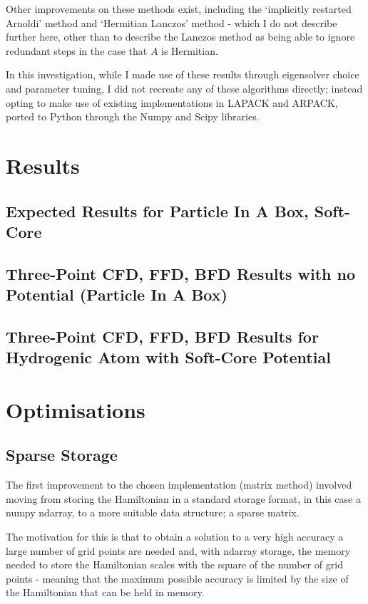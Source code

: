 Other improvements on these methods exist, including the `implicitly restarted Arnoldi' method and `Hermitian Lanczos' method - which I do not describe further here, other than to describe the Lanczos method as being able to ignore redundant steps in the case that $A$ is Hermitian.

In this investigation, while I made use of these results through eigensolver choice and parameter tuning, I did not recreate any of these algorithms directly; instead opting to make use of existing implementations in LAPACK and ARPACK, ported to Python through the Numpy and Scipy libraries.

\section{Results}
\subsection{Expected Results for Particle In A Box, Soft-Core}

\subsection{Three-Point CFD, FFD, BFD Results with no Potential (Particle In A Box)}

\subsection{Three-Point CFD, FFD, BFD Results for Hydrogenic Atom with Soft-Core Potential}

\section{Optimisations}

\subsection{Sparse Storage}
The first improvement to the chosen implementation (matrix method) involved moving from storing the Hamiltonian in a standard storage format, in this case a numpy ndarray, to a more suitable data structure; a sparse matrix. 

The motivation for this is that to obtain a solution to a very high accuracy a large number of grid points are needed and, with ndarray storage, the memory needed to store the Hamiltonian scales with the square of the number of grid points - meaning that the maximum possible accuracy is limited by the size of the Hamiltonian that can be held in memory. 

